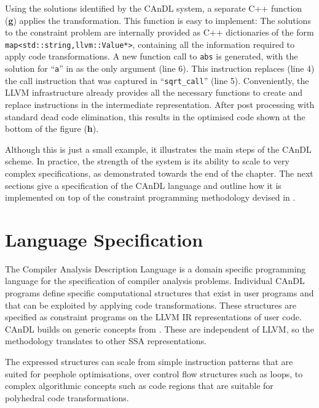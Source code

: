     
    Using the solutions identified by the CAnDL system, a separate C++ function
    ({\bf g}) applies the transformation.
    This function is easy to implement:
    The solutions to the constraint problem are internally provided as C++
    dictionaries of the form \texttt{map<std::string,llvm::Value*>},
    containing all the information required to apply code transformations.
    A new function call to \texttt{abs} is generated, with the solution for
    ``\texttt{a}'' in  as the only argument (line 6).
    This instruction replaces (line 4) the call instruction that was captured
    in ``\texttt{sqrt\_call}'' (line 5).
    Conveniently, the LLVM infrastructure already provides all the necessary
    functions to create and replace instructions in the intermediate
    representation.
    After post processing with standard dead code elimination, this results in
    the optimised code shown at the bottom of the figure ({\bf h}).

    Although this is just a small example, it illustrates the main steps of the
    CAnDL scheme.
    In practice, the strength of the system is its ability to scale to very
    complex specifications, as demonstrated towards the end of the chapter.
    The next sections give a specification of the CAnDL language and outline
    how it is implemented on top of the constraint programming methodology
    devised in .

\begin{figure}[p]
    
    \label{fig:candlexample}
\end{figure}

\section{Language Specification}

    The Compiler Analysis Description Language is a domain specific
    programming language for the specification of compiler analysis problems. 
    Individual CAnDL programs define specific computational structures that
    exist in user programs and that can be exploited by applying code
    transformations.
    These structures are specified as constraint programs on the LLVM IR
    representations of user code.
    CAnDL builds on generic concepts from .
    These are independent of LLVM, so the methodology translates to other SSA
    representations.

    The expressed structures can scale from simple instruction patterns that are
    suited for peephole optimisations, over control flow structures such
    as loops, to complex algorithmic concepts such as code regions that are
    suitable for polyhedral code transformations.

